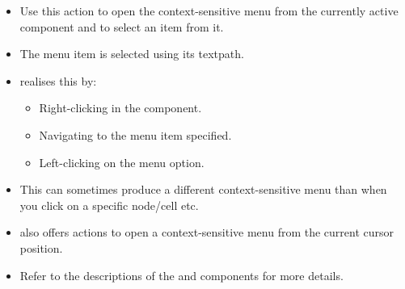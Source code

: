 \begin{itemize}
\item Use this action to open the context-sensitive menu from the currently active component and to select an item from it.
\item The menu item is selected using its textpath. 
\item \jb{} realises this by:
\begin{itemize}
\item Right-clicking in the component.
\item Navigating to the menu item specified.
\item Left-clicking on the menu option.  
\end{itemize}
\item This can sometimes produce a different context-sensitive menu than when you click on a specific node/cell etc.
 \item \jb{} also offers actions to open a context-sensitive menu from the current cursor position. 
\item Refer to the descriptions of the  and  components for more details. 

\end{itemize}

  

  